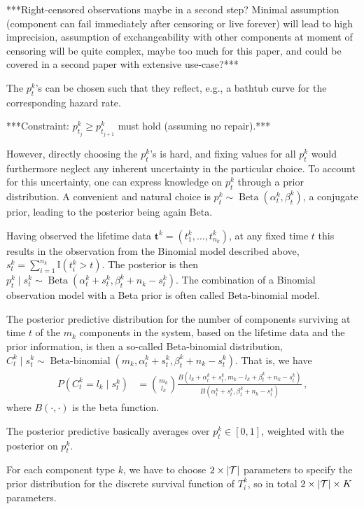 \documentclass[authoryear, 12pt, a4paper]{elsarticle}
\renewcommand{\vec}[1]{{\bm#1}}
\newcommand{\indic}{\mathbb{I}}
\newcommand{\be}{\operatorname{Beta}}
\newcommand{\bebin}{\operatorname{Beta-binomial}}
\begin{document}
***Right-censored observations maybe in a second step?
Minimal assumption (component can fail immediately after censoring or live forever)
will lead to high imprecision,
assumption of exchangeability with other components at moment of censoring
will be quite complex, maybe too much for this paper,
and could be covered in a second paper with extensive use-case?***

The $p^k_t$'s can be chosen such that they reflect, e.g., a bathtub curve for the corresponding hazard rate.

***Constraint: $p^k_{t_j} \ge p^k_{t_{j+1}}$ must hold (assuming no repair).***

However, directly choosing the $p^k_t$'s is hard,
and fixing values for all $p^k_t$ would furthermore neglect any inherent uncertainty in the particular choice.  
To account for this uncertainty, one can express knowledge on $p^k_t$ through a prior distribution.
A convenient and natural choice is $p^k_t \sim \be(\alpha^k_t, \beta^k_t)$, a conjugate prior,
leading to the posterior being again Beta.

Having observed the lifetime data $\vec{t}^k = (t^k_1, \ldots, t^k_{n_k})$,
at any fixed time $t$ this results in the observation from the Binomial model described above,
$s^k_t = \sum_{i=1}^{n_k} \indic(t^k_i > t)$.
The posterior is then $p^k_t \mid s^k_t \sim \be(\alpha^k_t + s^k_t, \beta^k_t + n_k - s^k_t)$.
The combination of a Binomial observation model with a Beta prior is often called Beta-binomial model.

The posterior predictive distribution for the number of components surviving at time $t$
of the $m_k$ components in the system, based on the lifetime data and the prior information,
is then a so-called Beta-binomial distribution,
$C^k_t \mid s^k_t \sim \bebin(m_k, \alpha^k_t + s^k_t, \beta^k_t + n_k - s^k_t)$.
That is, we have
\begin{align*}
P(C^k_t = l_k \mid s^k_t) &= {m_k \choose l_k} \frac{B(l_k + \alpha^k_t + s^k_t, m_k - l_k + \beta^k_t + n_k - s^k_t)}
                                                    {B(\alpha^k_t + s^k_t, \beta^k_t + n_k - s^k_t)} \,,
\end{align*}
where $B(\cdot, \cdot)$ is the beta function.

The posterior predictive basically averages over $p^k_t \in [0,1]$,
weighted with the posterior on $p^k_t$.

For each component type $k$, we have to choose $2 \times |{\cal T}|$
parameters to specify the prior distribution for the discrete survival function of $T^k_i$,
so in total $2 \times |{\cal T}| \times K$ parameters.
\end{document}
